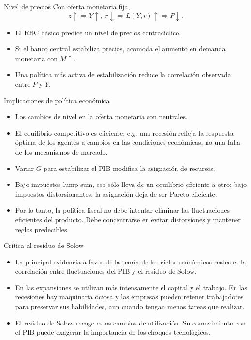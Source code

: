 \documentclass[aspectratio=169,11pt]{beamer}
\begin{document}
\begin{frame}{Nivel de precios}
  Con oferta monetaria fija,
  \[
    z\uparrow
    \Longrightarrow
    Y\uparrow,\;r\downarrow
    \Longrightarrow
    L(Y,r)\uparrow
    \Longrightarrow
    P\downarrow.
  \]

  \begin{itemize}
    \setlength{\itemsep}{0.6em}
    \item El RBC básico predice un nivel de precios contracíclico.
    \item Si el banco central estabiliza precios, acomoda el aumento en demanda monetaria con $M\uparrow$.
    \item Una política más activa de estabilización reduce la correlación observada entre $P$ y $Y$.
  \end{itemize}
\end{frame}

\begin{frame}{Implicaciones de política económica}
  \begin{itemize}
    \setlength{\itemsep}{0.65em}
    \item Los cambios de nivel en la oferta monetaria son neutrales.
    \item El equilibrio competitivo es eficiente; e.g. una recesión refleja la respuesta óptima de los agentes a cambios en las condiciones económicas, no una falla de los mecanismos de mercado.
    \item Variar $G$ para estabilizar el PIB modifica la asignación de recursos.
    \item Bajo impuestos lump-sum, eso sólo lleva de un equilibrio eficiente a otro; bajo impuestos distorsionantes, la asignación deja de ser Pareto eficiente.
    \item Por lo tanto, la política fiscal no debe intentar eliminar las fluctuaciones eficientes del producto. Debe concentrarse en evitar distorsiones y mantener reglas predecibles.
  \end{itemize}
\end{frame}





\begin{frame}{Crítica al residuo de Solow}
    \begin{itemize}
      \item La principal evidencia a favor de la teoría de los ciclos económicos reales es la correlación entre fluctuaciones del PIB y el residuo de Solow.

      \item En las expansiones se utilizan más intensamente el capital
        y el trabajo. En las recesiones hay maquinaria ociosa y las empresas pueden retener trabajadores para preservar sus habilidades, aun cuando tengan menos tareas que realizar.

        \item El residuo de Solow recoge estos cambios de utilización.
        Su comovimiento con el PIB puede exagerar la importancia de
        los choques tecnológicos.
    \end{itemize}
\end{frame}
\end{document}
